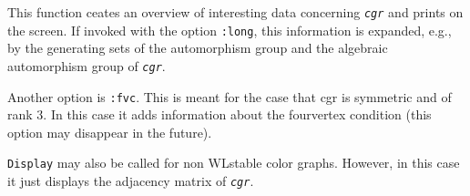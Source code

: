 \documentclass[a4paper,11pt]{report}
\begin{document}
{{{ This function ceates an overview of interesting data concerning \mbox{\texttt{\mdseries\slshape cgr}} and prints on the screen. If invoked with the option \texttt{:long}, this information is expanded, e.g., by the generating sets of the
automorphism group and the algebraic automorphism group of \mbox{\texttt{\mdseries\slshape cgr}}. 

 Another option is \texttt{:fvc}. This is meant for the case that cgr is symmetric and of rank $3$. In this case it adds information about the four\texttt{}vertex
condition (this option may disappear in the future). 

 \texttt{Display} may also be called for non WL\texttt{}stable color graphs. However,
in this case it just displays the adjacency matrix of \mbox{\texttt{\mdseries\slshape cgr}}. }

 }

 }

 
\end{document}
